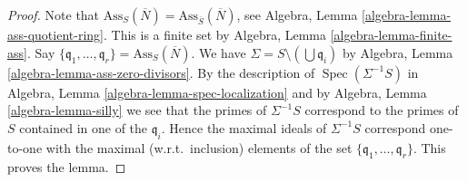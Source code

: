 \documentclass[10pt,a4paper]{amsart}
\theoremstyle{plain}
\theoremstyle{definition}
\theoremstyle{remark}
\numberwithin{equation}{subsection}
\def\Spec{\mathop{\mathrm{Spec}}}
\begin{document}
\begin{proof}
Note that
$\text{Ass}_S(\overline{N}) = \text{Ass}_{\overline{S}}(\overline{N})$, see
Algebra, Lemma \ref{algebra-lemma-ass-quotient-ring}.
This is a finite set by
Algebra, Lemma \ref{algebra-lemma-finite-ass}.
Say $\{\mathfrak q_1, \ldots, \mathfrak q_r\} = \text{Ass}_S(\overline{N})$.
We have $\Sigma = S \setminus (\bigcup \mathfrak q_i)$ by
Algebra, Lemma \ref{algebra-lemma-ass-zero-divisors}.
By the description of $\Spec(\Sigma^{-1}S)$ in
Algebra, Lemma \ref{algebra-lemma-spec-localization}
and by
Algebra, Lemma \ref{algebra-lemma-silly}
we see that the primes of $\Sigma^{-1}S$ correspond to the primes of
$S$ contained in one of the $\mathfrak q_i$.
Hence the maximal ideals of $\Sigma^{-1}S$ correspond one-to-one with the
maximal (w.r.t.\ inclusion) elements of the set
$\{\mathfrak q_1, \ldots, \mathfrak q_r\}$. This proves the lemma.
\end{proof}
\end{document}
